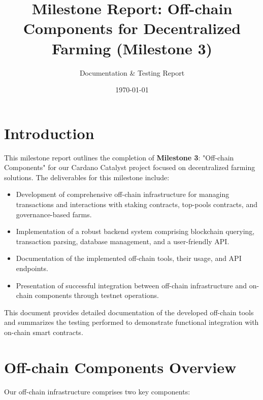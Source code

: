 \documentclass{article}
\title{Milestone Report: Off-chain Components for Decentralized Farming (Milestone 3)}
\author{Documentation \& Testing Report}
\date{\today}
\begin{document}
\maketitle

\vspace{8em}

\tableofcontents

\newpage

\section{Introduction}
This milestone report outlines the completion of \textbf{Milestone 3}: "Off-chain Components" for our Cardano Catalyst project focused on decentralized farming solutions. The deliverables for this milestone include:

\begin{itemize}
    \item Development of comprehensive off-chain infrastructure for managing transactions and interactions with staking contracts, top-pools contracts, and governance-based farms.
    \item Implementation of a robust backend system comprising blockchain querying, transaction parsing, database management, and a user-friendly API.
    \item Documentation of the implemented off-chain tools, their usage, and API endpoints.
    \item Presentation of successful integration between off-chain infrastructure and on-chain components through testnet operations.
\end{itemize}

This document provides detailed documentation of the developed off-chain tools and summarizes the testing performed to demonstrate functional integration with on-chain smart contracts.

\section{Off-chain Components Overview}

Our off-chain infrastructure comprises two key components:
\end{document}
